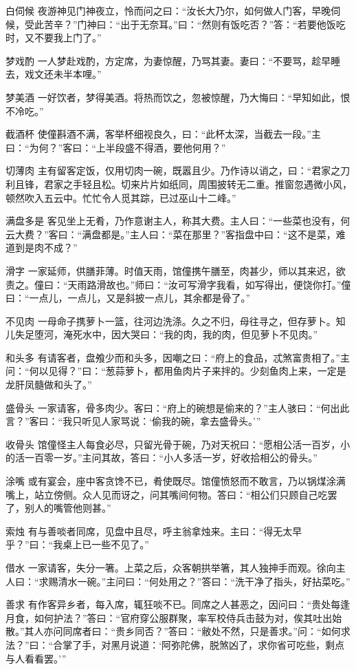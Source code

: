 \documentclass[12pt,UTF8]{ctexbook}
\begin{document}
白伺候
夜游神见门神夜立，怜而问之曰：“汝长大乃尔，如何做人门客，早晚伺候，受此苦辛？”门神曰：“出于无奈耳。”曰：“然则有饭吃否？”答：“若要他饭吃时，又不要我上门了。”

梦戏酌
一人梦赴戏酌，方定席，为妻惊醒，乃骂其妻。妻曰：“不要骂，趁早睡去，戏文还未半本哩。”

梦美酒
一好饮者，梦得美酒。将热而饮之，忽被惊醒，乃大悔曰：“早知如此，恨不冷吃。”

截酒杯
使僮斟酒不满，客举杯细视良久，曰：“此杯太深，当截去一段。”主曰：“为何？”客曰：“上半段盛不得酒，要他何用？”

切薄肉
主有留客定饭，仅用切肉一碗，既嚣且少。乃作诗以诮之，曰：“君家之刀利且锋，君家之手轻且松。切来片片如纸同，周围披转无二重。推窗忽遇微小风，顿然吹入五云中。忙忙令人觅其踪，已过巫山十二峰。”

满盘多是
客见坐上无肴，乃作意谢主人，称其大费。主人曰：“一些菜也没有，何云大费？”客曰：“满盘都是。”主人曰：“菜在那里？”客指盘中曰：“这不是菜，难道到是肉不成？”

滑字
一家延师，供膳菲薄。时值天雨，馆僮携午膳至，肉甚少，师以其来迟，欲责之。僮曰：“天雨路滑故也。”师曰：“汝可写滑字我看，如写得出，便饶你打。”僮曰：“一点儿，一点儿，又是斜披一点儿，其余都是骨了。”

不见肉
一母命子携萝卜一篮，往河边洗涤。久之不归，母往寻之，但存萝卜。知儿失足堕河，淹死水中，因大哭曰：“我的肉，我的肉，但见萝卜不见肉。”

和头多
有请客者，盘飧少而和头多，因嘲之曰：“府上的食品，忒煞富贵相了。”主问：“何以见得？”曰：“葱蒜萝卜，都用鱼肉片子来拌的。少刻鱼肉上来，一定是龙肝凤髓做和头了。”

盛骨头
一家请客，骨多肉少。客曰：“府上的碗想是偷来的？”主人骇曰：“何出此言？”客曰：“我只听见人家骂说：‘偷我的碗，拿去盛骨头。’”

收骨头
馆僮怪主人每食必尽，只留光骨于碗，乃对天祝曰：“愿相公活一百岁，小的活一百零一岁。”主问其故，答曰：“小人多活一岁，好收拾相公的骨头。”

涂嘴
或有宴会，座中客贪馋不已，肴使既尽。馆僮愤怒而不敢言，乃以锅煤涂满嘴上，站立傍侧。众人见而讶之，问其嘴间何物。答曰：“相公们只顾自己吃罢了，别人的嘴管他则甚。”

索烛
有与善啖者同席，见盘中且尽，呼主翁拿烛来。主曰：“得无太早乎？”曰：“我桌上已一些不见了。”

借水
一家请客，失分一箸。上菜之后，众客朝拱举箸，其人独抻手而观。徐向主人曰：“求赐清水一碗。”主问曰：“何处用之？”答曰：“洗干净了指头，好拈菜吃。”

善求
有作客异乡者，每入席，辄狂啖不已。同席之人甚恶之，因问曰：“贵处每逢月食，如何护法？”答曰：“官府穿公服群聚，率军校侍兵击鼓为对，俟其吐出始散。”其人亦问同席者曰：“贵乡同否？”答曰：“敝处不然，只是善求。”问：“如何求法？”曰：“合掌了手，对黑月说道：‘阿弥陀佛，脱煞凶了，求你省可吃些，剩点与人看看罢。’”
\end{document}
